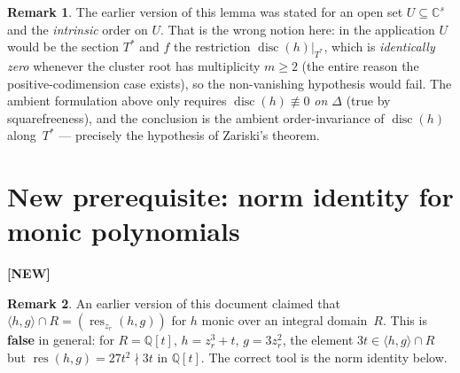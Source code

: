 \documentclass[11pt]{article}
\theoremstyle{plain}
\theoremstyle{definition}
\newtheorem*{remark}{Remark}
\newcommand{\C}{\mathbb{C}}
\newcommand{\Q}{\mathbb{Q}}
\DeclareMathOperator{\res}{res}
\DeclareMathOperator{\disc}{disc}
\begin{document}
\begin{remark}
The earlier version of this lemma was stated for an open set $U \subseteq \C^s$
and the \emph{intrinsic} order on $U$.  That is the wrong notion here: in the
application $U$ would be the section $T^*$ and $f$ the restriction
$\disc(h)|_{T^*}$, which is \emph{identically zero} whenever the cluster root
has multiplicity $m \ge 2$ (the entire reason the positive-codimension case
exists), so the non-vanishing hypothesis would fail.  The ambient formulation
above only requires $\disc(h) \not\equiv 0$ \emph{on $\Delta$} (true by
squarefreeness), and the conclusion is the ambient order-invariance of
$\disc(h)$ along~$T^*$ --- precisely the hypothesis of Zariski's theorem.
\end{remark}

\section{New prerequisite: norm identity for monic polynomials}
\label{sec:norm_identity}

\textbf{[NEW]}

\begin{remark}
An earlier version of this document claimed that
$\langle h, g \rangle \cap R = (\res_{z_r}(h, g))$
for $h$ monic over an integral domain~$R$.  This is \textbf{false} in
general: for $R = \Q[t]$, $h = z_r^3 + t$, $g = 3z_r^2$,
the element $3t \in \langle h, g \rangle \cap R$ but
$\res(h, g) = 27t^2 \nmid 3t$ in $\Q[t]$.
The correct tool is the norm identity below.
\end{remark}
\end{document}
